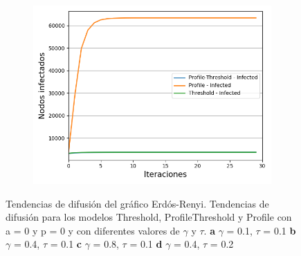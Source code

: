 \documentclass{article}
\begin{document}
\begin{figure}[!tbp]
\begin{subfigure}[b]{0.5\textwidth}
		\caption{}
		\label{fig:f23}
	\end{subfigure}
	\hfill
	\begin{subfigure}[b]{0.5\textwidth}
		\includegraphics[width=\textwidth, height=\textwidth]{../Images/Fig 2 d).png}
		\caption{}
		\label{fig:f24}
	\end{subfigure}
	\caption{Tendencias de difusión del gráfico Erdós-Renyi. Tendencias de difusión para los modelos Threshold, ProfileThreshold y Profile con a = 0 y p = 0 y con diferentes valores de $\gamma$ y $\tau$. \textbf{a} $\gamma$ = 0.1, $\tau$ = 0.1 \textbf{b} $\gamma$ = 0.4, $\tau$ = 0.1 \textbf{c} $\gamma$ = 0.8, $\tau$ = 0.1 \textbf{d} $\gamma$ = 0.4, $\tau$ = 0.2}
\end{figure}
\end{document}
